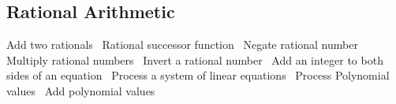 \subsection{Rational Arithmetic}

\nwenddocs{}\endmoddef\nwstartdeflinemarkup\nwenddeflinemarkup
\LA{}Add two rationals~{\nwtagstyle{}}\RA{}
\LA{}Rational successor function~{\nwtagstyle{}}\RA{}
\LA{}Negate rational number~{\nwtagstyle{}}\RA{}
\LA{}Multiply rational numbers~{\nwtagstyle{}}\RA{}
\LA{}Invert a rational number~{\nwtagstyle{}}\RA{}
\LA{}Add an integer to both sides of an equation~{\nwtagstyle{}}\RA{}
\LA{}Process a system of linear equations~{\nwtagstyle{}}\RA{}
\LA{}Process Polynomial values~{\nwtagstyle{}}\RA{}
\LA{}Add polynomial values~{\nwtagstyle{}}\RA{}

\nwendcode{}\nwdocspar

